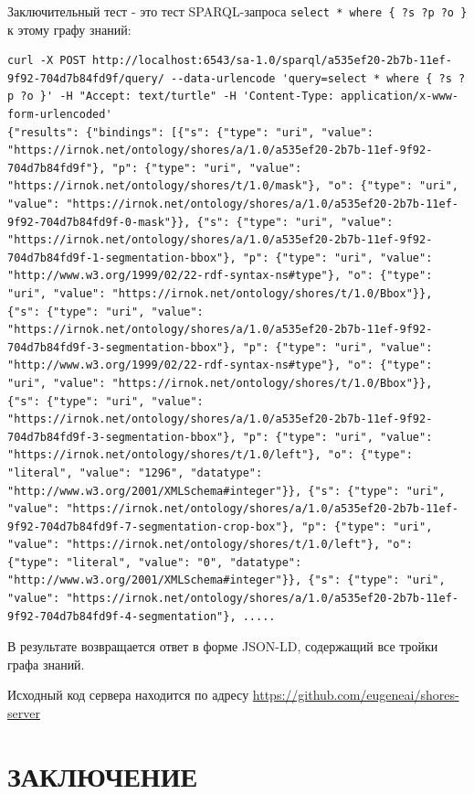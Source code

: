 \documentclass[732,fontsize=14pt,final]{studrep}
\begin{document}
Заключительный тест - это тест SPARQL-запроса \verb|select * where { ?s ?p ?o }| к этому графу знаний:
\begin{verbatim}
curl -X POST http://localhost:6543/sa-1.0/sparql/a535ef20-2b7b-11ef-9f92-704d7b84fd9f/query/ --data-urlencode 'query=select * where { ?s ?p ?o }' -H "Accept: text/turtle" -H 'Content-Type: application/x-www-form-urlencoded'
{"results": {"bindings": [{"s": {"type": "uri", "value": "https://irnok.net/ontology/shores/a/1.0/a535ef20-2b7b-11ef-9f92-704d7b84fd9f"}, "p": {"type": "uri", "value": "https://irnok.net/ontology/shores/t/1.0/mask"}, "o": {"type": "uri", "value": "https://irnok.net/ontology/shores/a/1.0/a535ef20-2b7b-11ef-9f92-704d7b84fd9f-0-mask"}}, {"s": {"type": "uri", "value": "https://irnok.net/ontology/shores/a/1.0/a535ef20-2b7b-11ef-9f92-704d7b84fd9f-1-segmentation-bbox"}, "p": {"type": "uri", "value": "http://www.w3.org/1999/02/22-rdf-syntax-ns#type"}, "o": {"type": "uri", "value": "https://irnok.net/ontology/shores/t/1.0/Bbox"}}, {"s": {"type": "uri", "value": "https://irnok.net/ontology/shores/a/1.0/a535ef20-2b7b-11ef-9f92-704d7b84fd9f-3-segmentation-bbox"}, "p": {"type": "uri", "value": "http://www.w3.org/1999/02/22-rdf-syntax-ns#type"}, "o": {"type": "uri", "value": "https://irnok.net/ontology/shores/t/1.0/Bbox"}}, {"s": {"type": "uri", "value": "https://irnok.net/ontology/shores/a/1.0/a535ef20-2b7b-11ef-9f92-704d7b84fd9f-3-segmentation-bbox"}, "p": {"type": "uri", "value": "https://irnok.net/ontology/shores/t/1.0/left"}, "o": {"type": "literal", "value": "1296", "datatype": "http://www.w3.org/2001/XMLSchema#integer"}}, {"s": {"type": "uri", "value": "https://irnok.net/ontology/shores/a/1.0/a535ef20-2b7b-11ef-9f92-704d7b84fd9f-7-segmentation-crop-box"}, "p": {"type": "uri", "value": "https://irnok.net/ontology/shores/t/1.0/left"}, "o": {"type": "literal", "value": "0", "datatype": "http://www.w3.org/2001/XMLSchema#integer"}}, {"s": {"type": "uri", "value": "https://irnok.net/ontology/shores/a/1.0/a535ef20-2b7b-11ef-9f92-704d7b84fd9f-4-segmentation"}, .....
\end{verbatim}
В результате возвращается ответ в форме JSON-LD, содержащий все тройки графа знаний.

Исходный код сервера находится по адресу \url{https://github.com/eugeneai/shores-server}

\chapter*{ЗАКЛЮЧЕНИЕ}
\end{document}
